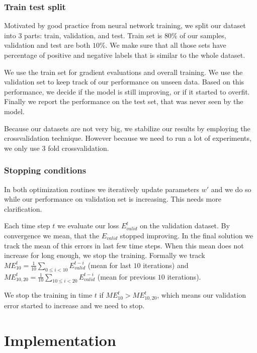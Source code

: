     \subsubsection{Train test split} 
    
    Motivated by good practice from neural network training,
    we split our dataset into $3$ parts: train, validation, and test.
    Train set is $80\%$ of our samples, validation and test are both $10\%$.
    We make sure that all those sets have percentage of positive and negative labels that is similar to the whole dataset.
    
    We use the train set for gradient evaluations and overall training. 
    We use the validation set to keep track of our performance on unseen data.
    Based on this performance, we decide if the model is still improving, or if it started to overfit.
    Finally we report the performance on the test set, that was never seen by the model.
    
    Because our datasets are not very big, we stabilize our results by employing the crossvalidation technique.  
    However because we need to run a lot of experiments, we only use $3$ fold crossvalidation.
    
    \subsubsection{Stopping conditions} 
    
    In both optimization routines we iteratively update parameters $w'$ and we do so while our performance on validation set is increasing.
    This needs more clarification.
    
    Each time step $t$ we evaluate our loss $E_{valid}^t$ on the validation dataset.
    By convergence we mean, that the $E_{valid}$ stopped improving.
    In the final solution we track the mean of this errors in last few time steps.
    When this mean does not increase for long enough, we stop the training. 
    Formally we track 
    $ME_{10}^t = \frac{1}{10} \sum_{0\leq i < 10} E_{valid}^{t-i}$ (mean for last $10$ iterations) and
    $ME_{10,20}^t = \frac{1}{10} \sum_{10\leq i < 20} E_{valid}^{t-i}$ (mean for previous $10$ iterations).
    
    We stop the training in time $t$ if $ME_{10}^t > ME_{10,20}^t$, which means our validation error started to increase and we need to stop.
    

\section{Implementation}
    
